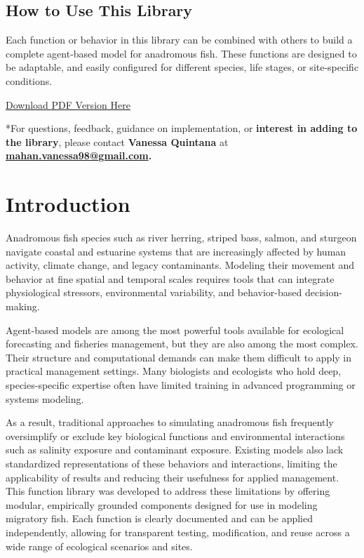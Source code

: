 \documentclass[
]{book}
\begin{document}
\section*{How to Use This Library}\label{how-to-use-this-library}

Each function or behavior in this library can be combined with others to build a complete agent-based model for anadromous fish. These functions are designed to be adaptable, and easily configured for different species, life stages, or site-specific conditions.

\href{docs/GoFish.pdf}{Download PDF Version Here}

*For questions, feedback, guidance on implementation, or \textbf{interest in adding to the library}, please contact \textbf{Vanessa Quintana} at \href{mailto:mahan.vanessa98@gmail.com}{\textbf{mahan.vanessa98@gmail.com}}\textbf{.}

\chapter{Introduction}\label{introduction}

Anadromous fish species such as river herring, striped bass, salmon, and sturgeon navigate coastal and estuarine systems that are increasingly affected by human activity, climate change, and legacy contaminants. Modeling their movement and behavior at fine spatial and temporal scales requires tools that can integrate physiological stressors, environmental variability, and behavior-based decision-making.

Agent-based models are among the most powerful tools available for ecological forecasting and fisheries management, but they are also among the most complex. Their structure and computational demands can make them difficult to apply in practical management settings. Many biologists and ecologists who hold deep, species-specific expertise often have limited training in advanced programming or systems modeling.

As a result, traditional approaches to simulating anadromous fish frequently oversimplify or exclude key biological functions and environmental interactions such as salinity exposure and contaminant exposure. Existing models also lack standardized representations of these behaviors and interactions, limiting the applicability of results and reducing their usefulness for applied management. This function library was developed to address these limitations by offering modular, empirically grounded components designed for use in modeling migratory fish. Each function is clearly documented and can be applied independently, allowing for transparent testing, modification, and reuse across a wide range of ecological scenarios and sites.
\end{document}
